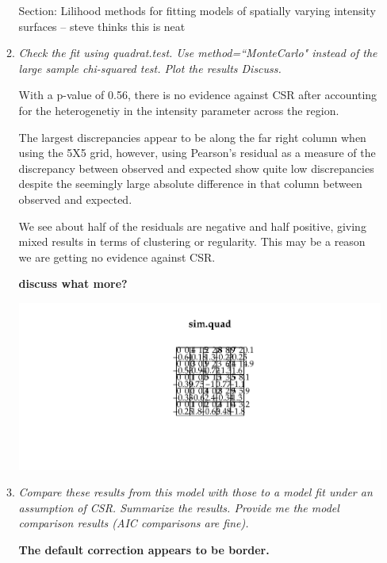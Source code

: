 \documentclass{article}\usepackage[]{graphicx}\usepackage[]{color}
\makeatletter
\def\maxwidth{ %
  \ifdim\Gin@nat@width>\linewidth
    \linewidth
  \else
    \Gin@nat@width
  \fi
}
\newenvironment{knitrout}{}{} %
\makeatother
\begin{document}
\begin{enumerate}
\begin{enumerate}
Section: Lilihood methods for fitting models of spatially varying intensity surfaces -- steve thinks this is neat

\item %
{\it Check the fit using quadrat.test. Use method=``MonteCarlo" instead of the large sample chi-squared test. Plot the results Discuss.}

With a p-value of 0.56, there is no evidence against CSR after accounting for the heterogenetiy in the intensity parameter across the region.

The largest discrepancies appear to be along the far right column when using the 5X5 grid, however, using Pearson's residual as a measure of the discrepancy between observed and expected show quite low discrepancies despite the seemingly large absolute difference in that column between observed and expected. 

We see about half of the residuals are negative and half positive, giving mixed results in terms of clustering or regularity. This may be a reason we are getting no evidence against CSR.

{\bf discuss what more?}


\begin{knitrout}\footnotesize
{}\color{fgcolor}

{\centering \includegraphics[width=\maxwidth]{figure/prob2d-1} 

}



\end{knitrout}

\item %
{\it Compare these results from this model with those to a model fit under an assumption of CSR. Summarize the results. Provide me the model comparison results (AIC comparisons are fine).}

{\bf The default correction appears to be border.}


\end{enumerate}
\end{enumerate}
\end{document}
